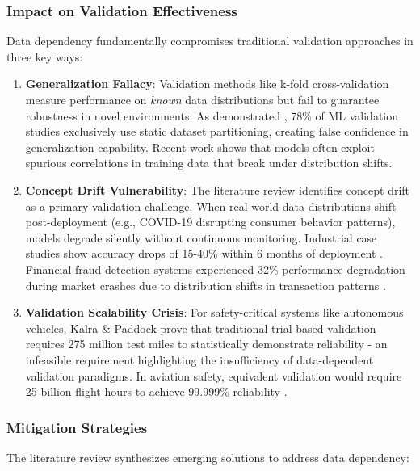 \documentclass[manuscript,screen,review]{acmart}
\begin{document}
\subsubsection{Impact on Validation Effectiveness}

Data dependency fundamentally compromises traditional validation approaches in three key ways:

\begin{enumerate}
    \item \textbf{Generalization Fallacy}: Validation methods like k-fold cross-validation measure performance on \textit{known} data distributions but fail to guarantee robustness in novel environments. As demonstrated , 78\% of ML validation studies exclusively use static dataset partitioning, creating false confidence in generalization capability. Recent work shows that models often exploit spurious correlations in training data that break under distribution shifts.
    
    \item \textbf{Concept Drift Vulnerability}: The literature review identifies concept drift as a primary validation challenge. When real-world data distributions shift post-deployment (e.g., COVID-19 disrupting consumer behavior patterns), models degrade silently without continuous monitoring. Industrial case studies show accuracy drops of 15-40\% within 6 months of deployment . Financial fraud detection systems experienced 32\% performance degradation during market crashes due to distribution shifts in transaction patterns .
    
    \item \textbf{Validation Scalability Crisis}: For safety-critical systems like autonomous vehicles, Kalra \& Paddock  prove that traditional trial-based validation requires 275 million test miles to statistically demonstrate reliability - an infeasible requirement highlighting the insufficiency of data-dependent validation paradigms. In aviation safety, equivalent validation would require 25 billion flight hours to achieve 99.999\% reliability .
\end{enumerate}

\subsubsection{Mitigation Strategies}
The literature review synthesizes emerging solutions to address data dependency:
\end{document}
